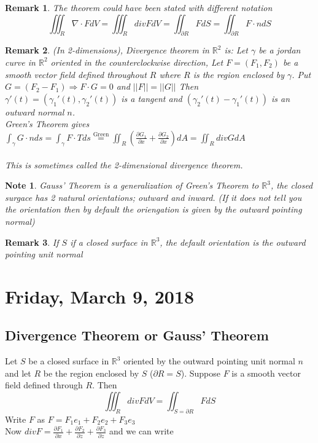 \documentclass[12pt]{article}
\theoremstyle{plain}
\newtheorem*{remark}{Remark}
\newtheorem*{note}{Note}
\theoremstyle{definition}
\begin{document}
\begin{remark}
	The theorem could have been stated with different notation
	$$\iiint_R \nabla \cdot F dV = \iiint_R div F dV = \iint_{\partial R} F dS = \iint_{\partial R} F\cdot n dS$$
\end{remark}

\begin{remark}
	(In 2-dimensions), Divergence theorem in $\mathbb{R}^2$ is: Let $\gamma$ be a jordan curve in $\mathbb{R}^2$ oriented in the counterclockwise direction, Let $F = (F_1, F_2)$ be a smooth vector field defined throughout $R$ where $R$ is the region enclosed by $\gamma$. Put $G=(F_2 -F_1) \Longrightarrow F \cdot G = 0$ and $||F||=||G||$ Then $\gamma '(t) = (\gamma_1 '(t), \gamma_2 '(t))$ is a tangent and $(\gamma_2 '(t)-\gamma_1 '(t))$ is an outward normal $n$.\\
	Green's Theorem gives $\int_\gamma G \cdot n ds = \int_\gamma F \cdot T ds \overset{\text{Green}}{=} \iint_R (\frac{\partial G_1}{\partial x} + \frac{\partial G_2}{\partial x})dA = \iint_R div G dA$\\
	\\
	This is sometimes called the 2-dimensional divergence theorem.
\end{remark}

\begin{note}
	Gauss' Theorem is a generalization of Green's Theorem to $\mathbb{R}^3$, the closed surgace has 2 natural orientations; outward and inward. (If it does not tell you the orientation then by default the oriengation is given by the outward pointing normal)
\end{note}

\begin{remark}
	If $S$ if a closed surface in $\mathbb{R}^3$, the default orientation is the outward pointing unit normal
\end{remark}

\newpage

\section{Friday, March 9, 2018}

\subsection{Divergence Theorem or Gauss' Theorem}

Let $S$ be a closed surface in $\mathbb{R}^3$ oriented by the outward pointing unit normal $n$ and let $R$ be the region enclosed by $S$ ($\partial R = S$). Suppose $F$ is a smooth vector field defined through $R$. Then
$$\iiint_R div F dV = \iint_{S=\partial R} F dS$$
Write $F$ as $F=F_1 e_1 + F_2 e_2 + F_3 e_3$\\
Now $div F = \frac{\partial F_1}{\partial x} + \frac{\partial F_2}{\partial z} + \frac{\partial F_3}{\partial z}$ and we can write
\end{document}
